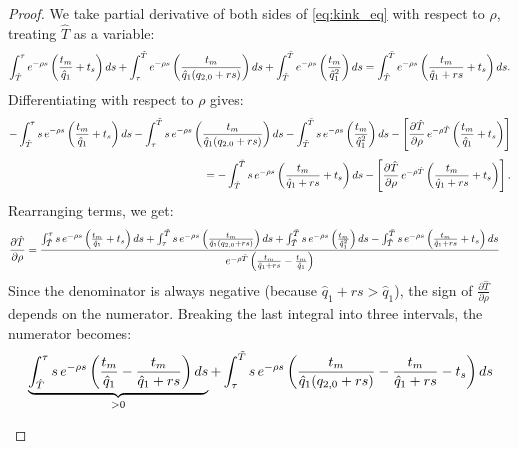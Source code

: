 \documentclass{article}
\theoremstyle{plain}
\theoremstyle{plain}
\begin{document}
\begin{proof}
We take partial derivative of both sides of \eqref{eq:kink_eq} with respect to $\rho$, treating $\hat{T}$ as a variable:
\[
\int_{\hat{T}}^{\tau}e^{-\rho s}\left(\frac{t_{m}}{\hat{q}_{1}}+t_{s}\right)ds+\int_{\tau}^{\tilde{T}}e^{-\rho s}\left(\frac{t_{m}}{\hat{q}_{1}(q_{2,0}+rs)}\right)ds+\int_{\tilde{T}}^{\bar{T}}e^{-\rho s}\left(\frac{t_{m}}{\hat{q}_{1}^{2}}\right)ds=\int_{\hat{T}}^{\bar{T}}e^{-\rho s}\left(\frac{t_{m}}{\hat{q}_{1}+rs}+t_{s}\right)ds.
\]
Differentiating with respect to $\rho$ gives: 
\begin{align*}
-\int_{\hat{T}}^{\tau} s\,e^{-\rho s}\left(\frac{t_{m}}{\hat{q}_{1}}+t_{s}\right)ds 
-\int_{\tau}^{\tilde{T}} s\,e^{-\rho s}\left(\frac{t_{m}}{\hat{q}_{1}(q_{2,0}+rs)}\right)ds 
-\int_{\tilde{T}}^{\bar{T}} s\,e^{-\rho s}\left(\frac{t_{m}}{\hat{q}_{1}^{2}}\right)ds
-\left[\frac{\partial\hat{T}}{\partial\rho}\,e^{-\rho\hat{T}}\left(\frac{t_{m}}{\hat{q}_{1}}+t_{s}\right)\right] \\[1ex]
= -\int_{\hat{T}}^{\bar{T}} s\,e^{-\rho s}\left(\frac{t_{m}}{\hat{q}_{1}+rs}+t_{s}\right)ds
-\left[\frac{\partial\hat{T}}{\partial\rho}\,e^{-\rho\hat{T}}\left(\frac{t_{m}}{\hat{q}_{1}+rs}+ t_{s}\right)\right].
\end{align*}
Rearranging terms, we get: 
\begin{align*}
\frac{\partial\hat{T}}{\partial\rho} & =\frac{\int_{\hat{T}}^{\tau} s\,e^{-\rho s}\left(\frac{t_{m}}{\hat{q}_{1}}+t_{s}\right)ds+\int_{\tau}^{\tilde{T}} s\,e^{-\rho s}\left(\frac{t_{m}}{\hat{q}_{1}(q_{2,0}+rs)}\right)ds+\int_{\tilde{T}}^{\bar{T}} s\,e^{-\rho s}\left(\frac{t_{m}}{\hat{q}_{1}^{2}}\right)ds-\int_{\hat{T}}^{\bar{T}} s\,e^{-\rho s}\left(\frac{t_{m}}{\hat{q}_{1}+rs}+t_{s}\right)ds}{e^{-\rho\hat{T}}\left(\frac{t_{m}}{\hat{q}_{1}+rs}-\frac{t_{m}}{\hat{q}_{1}}\right)}
\end{align*}
Since the denominator is always negative (because $\hat{q}_{1}+rs>\hat{q}_{1}$), the sign of $\frac{\partial\hat{T}}{\partial\rho}$ depends on the numerator.  
Breaking the last integral into three intervals, the numerator becomes:
\begin{align*}
 & \underbrace{\int_{\hat{T}}^{\tau} s\,e^{-\rho s} \left(\frac{\machinetime}{\hat{q}_{1}} - \frac{\machinetime}{\hat{q}_{1} + rs}\right) ds}_{>0} 
+ \int_{\tau}^{\tilde{T}} s\,e^{-\rho s} \left(\frac{\machinetime}{\hat{q}_{1}(q_{2,0} + rs)} - \frac{\machinetime}{\hat{q}_{1} + rs} - \handofftime{}\right) ds \\[1ex]

\end{align*}
\end{proof}
\end{document}

